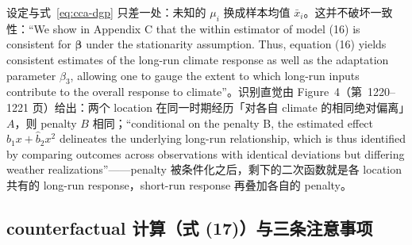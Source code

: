 设定与式~\ref{eq:cca-dgp} 只差一处：未知的 $\mu_i$ 换成样本均值 $\bar{x}_i$。这并不破坏一致性：``We show in Appendix C that the within estimator of model (16) is consistent for $\boldsymbol{\beta}$ under the stationarity assumption. Thus, equation (16) yields consistent estimates of the long-run climate response as well as the adaptation parameter $\beta_3$, allowing one to gauge the extent to which long-run inputs contribute to the overall response to climate''\citep[第~1220 页；兑现第~1214 页脚注~17「正确设定要求知道 $\mu_i$，但一致估计不要求」的预告]{merel2021climate}。识别直觉由 Figure~4（第~1220--1221 页）给出：两个 location 在同一时期经历「对各自 climate 的相同绝对偏离」$A$，则 penalty $B$ 相同；``conditional on the penalty B, the estimated effect $\hat{b}_1 x + \hat{b}_2 x^2$ delineates the underlying long-run relationship, which is thus identified by comparing outcomes across observations with identical deviations but differing weather realizations''\citep[第~1221 页]{merel2021climate}——penalty 被条件化之后，剩下的二次函数就是各 location 共有的 long-run response，short-run response 再叠加各自的 penalty。

\subsection{counterfactual 计算（式 (17)）与三条注意事项}

